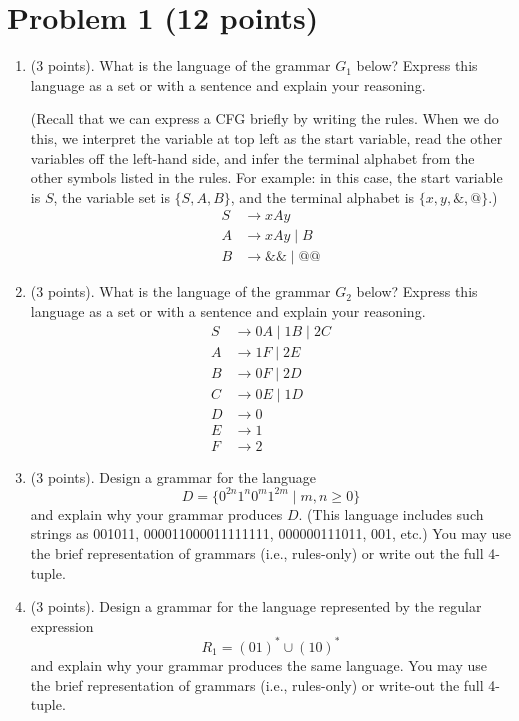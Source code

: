 \documentclass[letterpaper,11pt,twoside]{article}
\theoremstyle{plain}
\theoremstyle{definition}
\theoremstyle{remark}
\theoremstyle{restate}
\begin{document}
\clearpage
\section{Problem 1 (12 points)}
    \begin{enumerate}
        \item (3 points). What is the language of the grammar $G_1$ below? Express this language as a set or with a sentence and explain your reasoning.
        
        (Recall that we can express a CFG briefly by writing the rules. When we do this, we interpret the variable at top left as the start variable, read the other variables off the left-hand side, and infer the terminal alphabet from the other symbols listed in the rules. For example: in this case, the start variable is $S$, the variable set is $\{S, A, B\}$, and the terminal alphabet is $\{x, y, \&, @\}$.)
        \begin{align*}
            S &\rightarrow xAy \\
            A &\rightarrow xAy \; | \; B \\
            B &\rightarrow \&\& \; | \; @@
        \end{align*}
        
        \item (3 points). What is the language of the grammar $G_2$ below? Express this language as a set or with a sentence and explain your reasoning.
        \begin{align*}
            S &\rightarrow 0A \; | \; 1B \; | \; 2C \\
            A &\rightarrow 1F \; | \; 2E \\
            B &\rightarrow 0F \; | \; 2D \\
            C &\rightarrow 0E \; | \; 1D \\
            D &\rightarrow 0 \\
            E &\rightarrow 1 \\
            F &\rightarrow 2
        \end{align*}
        
        \item (3 points). Design a grammar for the language
        \[
            D = \{0^{2n}1^n0^m1^{2m} \; | \; m,n \geq 0\}
        \]
        and explain why your grammar produces $D$. (This language includes such strings as 001011, 000011000011111111, 000000111011, 001, etc.) You may use the brief representation of grammars (i.e., rules-only) or write out the full 4-tuple.
        
        \item (3 points). Design a grammar for the language represented by the regular expression
        \[
            R_1 = (01)^* \cup (10)^*
        \]
        and explain why your grammar produces the same language. You may use the brief representation of grammars (i.e., rules-only) or write-out the full 4-tuple.
    \end{enumerate}
\end{document}
